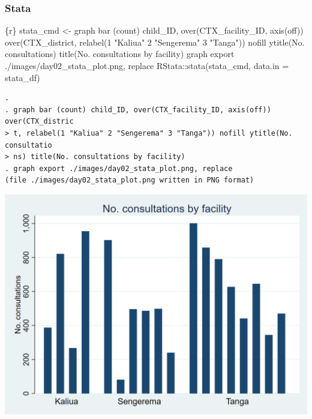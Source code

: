 \documentclass[
  letterpaper,
  DIV=11,
  numbers=noendperiod,
  oneside]{scrreprt}
\newenvironment{Shaded}{\begin{snugshade}}{\end{snugshade}}
\newcommand{\AttributeTok}[1]{\textcolor[rgb]{0.40,0.45,0.13}{#1}}
\newcommand{\FunctionTok}[1]{\textcolor[rgb]{0.28,0.35,0.67}{#1}}
\newcommand{\InformationTok}[1]{\textcolor[rgb]{0.37,0.37,0.37}{#1}}
\newcommand{\NormalTok}[1]{\textcolor[rgb]{0.00,0.23,0.31}{#1}}
\newcommand{\OtherTok}[1]{\textcolor[rgb]{0.00,0.23,0.31}{#1}}
\newcommand{\SpecialCharTok}[1]{\textcolor[rgb]{0.37,0.37,0.37}{#1}}
\newcommand{\StringTok}[1]{\textcolor[rgb]{0.13,0.47,0.30}{#1}}
\begin{document}
\hypertarget{stata-11}{%
\subsubsection{Stata}\label{stata-11}}

\begin{Shaded}
\begin{Highlighting}[]
\InformationTok{\textasciigrave{}\textasciigrave{}\textasciigrave{}\{r\}}
\NormalTok{stata\_cmd }\OtherTok{\textless{}{-}} \StringTok{\textquotesingle{}}
\StringTok{graph bar (count) child\_ID, over(CTX\_facility\_ID, axis(off)) over(CTX\_district, relabel(1 "Kaliua" 2 "Sengerema" 3 "Tanga")) nofill ytitle(No. consultations) title(No. consultations by facility)}
\StringTok{graph export ./images/day02\_stata\_plot.png, replace}
\StringTok{\textquotesingle{}}
\NormalTok{RStata}\SpecialCharTok{::}\FunctionTok{stata}\NormalTok{(stata\_cmd,}
              \AttributeTok{data.in =}\NormalTok{ stata\_df)}
\InformationTok{\textasciigrave{}\textasciigrave{}\textasciigrave{}}
\end{Highlighting}
\end{Shaded}

\begin{verbatim}
. 
. graph bar (count) child_ID, over(CTX_facility_ID, axis(off)) over(CTX_distric
> t, relabel(1 "Kaliua" 2 "Sengerema" 3 "Tanga")) nofill ytitle(No. consultatio
> ns) title(No. consultations by facility)
. graph export ./images/day02_stata_plot.png, replace
(file ./images/day02_stata_plot.png written in PNG format)
\end{verbatim}

\includegraphics{./images/day02_stata_plot.png}
\end{document}
